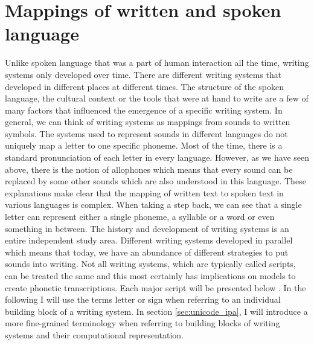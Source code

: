 \section{Mappings of written and spoken language}
\label{writing-sys}
Unlike spoken language that was a part of human interaction all the time, writing systems only developed over time. There are different writing systems that developed in different places at different times. The structure of the spoken language, the cultural context or the tools that were at hand to write are a few of many factors that influenced the emergence of a specific writing system. In general, we can think of writing systems as mappings from sounds to written symbols. The systems used to represent sounds in different languages do not uniquely map a letter to one specific phoneme. Most of the time, there is a standard pronunciation of each letter in every language. However, as we have seen above, there is the notion of allophones which means that every sound can be replaced by some other sounds which are also understood in this language. These explanations make clear that the mapping of written text to spoken text in various languages is complex. When taking a step back, we can see that a single letter can represent either a single phoneme, a syllable or a word or even something in between. The history and development of writing systems is an entire independent study area. Different writing systems developed in parallel which means that today, we have an abundance of different strategies to put sounds into writing. Not all writing systems, which are typically called scripts, can be treated the same and this most certainly has implications on models to create phonetic transcriptions. Each major script will be presented below \citep{writing-systems}. In the following I will use the terms letter or sign when referring to an individual building block of a writing system. In section \ref{sec:unicode_ipa}, I will introduce a more fine-grained terminology when referring to building blocks of writing systems and their computational representation. 

